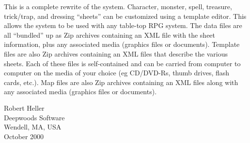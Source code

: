 This is a complete rewrite of the system.  Character, monster, spell, treasure,
trick/trap, and dressing ``sheets'' can be customized using a template
editor.  This allows the system to be used with any table-top RPG
system.  The data files are all ``bundled'' up as Zip archives
containing an XML file with the sheet information, plus any associated
media (graphics files or documents).  Template files are also Zip
archives containing an XML files that describe the various sheets.  Each
of these files is self-contained and can be carried from computer to
computer on the media of your choice (eg CD/DVD-Rs, thumb drives, flash
cards, etc.).  Map files are also Zip archives containing an XML files
along with any associated media (graphics files or documents).

\vspace{.25in}
\noindent
Robert Heller \\
Deepwoods Software \\
Wendell, MA, USA \\
October 2000

